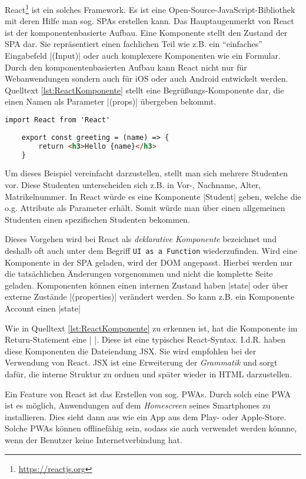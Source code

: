 React\footnote{\url{https://reactjs.org}} ist ein solches Framework. Es ist eine Open-Source-JavaScript-Bibliothek mit deren Hilfe man sog. \acfp{SPA} erstellen kann.\autocite[ ][]{hartmann2019react} 
Das Hauptaugenmerkt von React ist der komponentenbasierte Aufbau. Eine Komponente stellt den Zustand der \acs{SPA} dar. 
Sie repräsentiert einen fachlichen Teil wie z.B. ein \enquote{einfaches} Eingabefeld \jinline|(Input)| oder auch komplexere Komponenten wie ein Formular.
Durch den komponentenbasierten Aufbau kann React nicht nur für Webanwendungen sondern auch für iOS oder auch Android entwickelt werden. 
Quelltext \vref{lst:ReactKomponente} stellt eine Begrüßungs-Komponente dar, die einen Namen als Parameter \jinline|(props)| übergeben bekommt. 

\begin{lstlisting}[caption={React-Komponente: Greeting},label={lst:ReactKomponente},language=HTML, showstringspaces={false}]
	import React from 'React'
	
	export const greeting = (name) => {
		return <h3>Hello {name}</h3>
	}
\end{lstlisting}

Um dieses Beispiel vereinfacht darzustellen, stellt man sich mehrere Studenten vor. 
Diese Studenten unterscheiden sich z.B. in Vor-, Nachname, Alter, Matrikelnummer. 
In React würde es eine Komponente \jinline|Student| geben, welche die o.g. Attribute als Parameter erhält. 
Somit würde man über einen allgemeinen Studenten einen spezifischen Studenten bekommen. 

Dieses Vorgehen wird bei React als \emph{deklarative Komponente} bezeichnet und deshalb oft auch unter dem Begriff \texttt{UI as a Function} wiederzufinden. \autocite[ ][]{hartmann2019react} 
Wird eine Komponente in der \acs{SPA} geladen, wird der \acs{DOM} angepasst. 
Hierbei werden nur die tatsächlichen Änderungen vorgenommen und nicht die komplette Seite geladen. \newline
Komponenten können einen internen Zustand haben \jinline|state| oder über externe Zustände \jinline|(properties)| verändert werden. So kann z.B. ein Komponente Account einen \jinline|state| 

Wie in Quelltext \vref{lst:ReactKomponente} zu erkennen ist, hat die Komponente im Return-Statement eine \jinline|{ }|. 
Diese ist eine typisches React-Syntax. 
I.d.R. haben diese Komponenten die Dateiendung \acf{JSX}. 
Sie wird empfohlen bei der Verwendung von React. 
\acs{JSX} ist eine Erweiterung der \emph{Grammatik} und sorgt dafür, die interne Struktur zu ordnen und später wieder in \acs{HTML} darzustellen.\autocite[ ][]{WasIstJSX} 

Ein Feature von React ist das Erstellen von sog. \acfp{PWA}. 
Durch solch eine \acs{PWA} ist es möglich, Anwendungen auf dem \emph{Homescreen} seines Smartphones zu installieren. 
Dies sieht dann aus wie ein App aus dem Play- oder Apple-Store. 
Solche \acsp*{PWA} können offlinefähig sein, sodass sie auch verwendet werden könnne, wenn der Benutzer keine Internetverbindung hat. \autocite[ ][]{hartmann2019react} 

